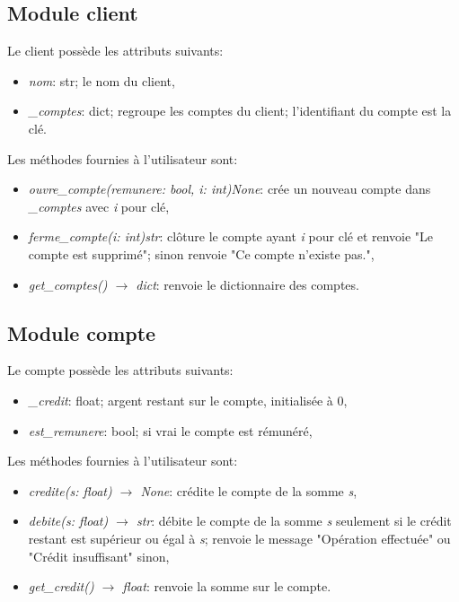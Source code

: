 \documentclass[a4paper,11pt]{article}
\begin{document}
\begin{Form}
\subsection{Module client}
Le client possède les attributs suivants:
\begin{itemize}
\item \emph{nom}: str; le nom du client,
\item \emph{\_comptes}: dict; regroupe les comptes du client; l'identifiant du compte est la clé.
\end{itemize}
Les méthodes fournies à l'utilisateur sont:
\begin{itemize}
\item \emph{ouvre\_compte(remunere: bool, i: int)\;\rightarrow\;None}: crée un nouveau compte dans \emph{\_comptes} avec \emph{i} pour clé,
\item \emph{ferme\_compte(i: int)\;\rightarrow\;str}: clôture le compte ayant \emph{i} pour clé et renvoie "Le compte est supprimé"; sinon renvoie "Ce compte n'existe pas.",
\item \emph{get\_comptes() $\rightarrow $ dict}: renvoie le dictionnaire des comptes.
\end{itemize}
\subsection{Module compte}
Le compte possède les attributs suivants:
\begin{itemize}
\item \emph{\_credit}: float; argent restant sur le compte, initialisée à 0,
\item \emph{est\_remunere}: bool; si vrai le compte est rémunéré,
\end{itemize}
Les méthodes fournies à l'utilisateur sont:
\begin{itemize}
\item \emph{credite(s: float) $\rightarrow$ None}: crédite le compte de la somme \emph{s},
\item \emph{debite(s: float) $\rightarrow$ str}: débite le compte de la somme \emph{s} seulement si le crédit restant est supérieur ou égal à \emph{s}; renvoie le message "Opération effectuée" ou "Crédit insuffisant" sinon,
\item \emph{get\_credit() $\rightarrow$ float}: renvoie la somme sur le compte.
\end{itemize}

\end{Form}
\end{document}
